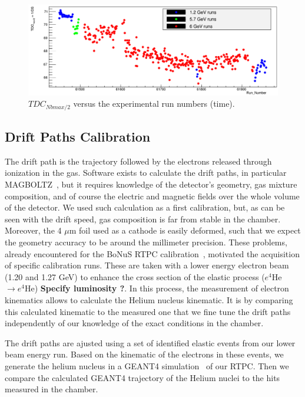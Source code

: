 \documentclass[twocolumn,showpacs,superscriptaddress,groupedaddress]{revtex4}
\begin{document}
\begin{figure}[tb]
\hspace*{-1.8cm}
\includegraphics[scale=0.26]{fig/Drift_run_number_1.png}
\caption{$TDC_{Nbmax/2}$ versus the experimental run numbers (time).  } 
\label{fig:Drift_run_number_1}
\end{figure}

   
\subsection{Drift Paths Calibration}

The drift path is the trajectory followed by the electrons released through 
ionization in the gas. Software exists to calculate the drift paths, in particular
MAGBOLTZ~\cite{MAGBOLTZ}, but it requires knowledge of the detector's 
geometry, gas mixture composition, and of course the electric and magnetic 
fields over the whole volume of the detector. We used such calculation as a 
first calibration, but, 
as can be seen with the drift speed, gas composition is far from stable in the 
chamber. Moreover, the 4 $\mu$m foil used as a cathode is easily deformed, such
that we expect the geometry accuracy to be around the millimeter precision. 
These problems, already 
encountered for the BoNuS RTPC calibration~\cite{BONUS-NIM}, motivated the 
acquisition of specific calibration runs. These are taken with a lower energy 
electron beam (1.20 and 1.27 GeV) to enhance the cross section of the elastic 
process ($e^{4}$He$\rightarrow e^{4}$He)
{\bf \color{red} Specify luminosity ?}. In this process, the measurement of
electron kinematics allows to calculate the Helium nucleus kinematic. It is
by comparing this calculated kinematic to the measured one that we fine tune
the drift paths independently of our knowledge of the exact conditions in the 
chamber.

The drift paths are ajusted using a set of identified elastic events 
from our lower beam energy run. Based on the kinematic of the electrons in
these events, we generate the helium nucleus in a GEANT4 
simulation~\cite{GEANT4} of our RTPC. Then we compare the calculated GEANT4 trajectory of 
the Helium nuclei to the hits measured in the chamber. 
\end{document}
